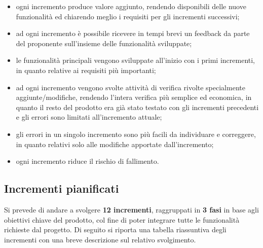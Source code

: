 \begin{itemize}
	\item ogni incremento produce valore aggiunto, rendendo disponibili delle nuove funzionalità ed chiarendo meglio i requisiti per gli incrementi successivi;
	\item ad ogni incremento è possibile ricevere in tempi brevi un feedback da parte del proponente sull'insieme delle funzionalità sviluppate;
	\item le funzionalità principali vengono sviluppate all'inizio con i primi incrementi, in quanto relative ai requisiti più importanti;
	\item ad ogni incremento vengono svolte attività di verifica rivolte specialmente aggiunte/modifiche, rendendo l'intera verifica più semplice ed economica, in quanto il resto del prodotto era già stato testato con gli incrementi precedenti e gli errori sono limitati all'incremento attuale;
	\item gli errori in un singolo incremento sono più facili da individuare e correggere, in quanto relativi solo alle modifiche apportate dall'incremento;
	\item ogni incremento riduce il rischio di fallimento.
\end{itemize}

\subsection{Incrementi pianificati}

Si prevede di andare a svolgere \textbf{12 incrementi}, raggruppati in \textbf{3 fasi} in base agli obiettivi chiave del prodotto, col fine di poter integrare tutte le funzionalità richieste dal progetto. Di seguito si riporta una tabella riassuntiva degli incrementi con una breve descrizione sul relativo svolgimento.

